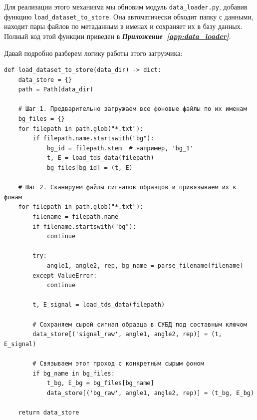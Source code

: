 Для реализации этого механизма мы обновим модуль \texttt{data\_loader.py}, добавив функцию \texttt{load\_dataset\_to\_store}. Она автоматически обходит папку с данными, находит пары файлов по метаданным в именах и сохраняет их в базу данных. Полный код этой функции приведен в \textbf{\textit{Приложение~\ref{app:data_loader}}}.

Давай подробно разберем логику работы этого загрузчика:
\begin{listing}[H]
	\caption{Реляционная загрузка данных в базу (data\_loader.py)}
	\begin{verbatim}
def load_dataset_to_store(data_dir) -> dict:
    data_store = {}
    path = Path(data_dir)
    
    # Шаг 1. Предварительно загружаем все фоновые файлы по их именам
    bg_files = {}
    for filepath in path.glob("*.txt"):
        if filepath.name.startswith("bg"):
            bg_id = filepath.stem  # например, 'bg_1'
            t, E = load_tds_data(filepath)
            bg_files[bg_id] = (t, E)
            
    # Шаг 2. Сканируем файлы сигналов образцов и привязываем их к фонам
    for filepath in path.glob("*.txt"):
        filename = filepath.name
        if filename.startswith("bg"):
            continue
            
        try:
            angle1, angle2, rep, bg_name = parse_filename(filename)
        except ValueError:
            continue
            
        t, E_signal = load_tds_data(filepath)
        
        # Сохраняем сырой сигнал образца в СУБД под составным ключом
        data_store[('signal_raw', angle1, angle2, rep)] = (t, E_signal)
        
        # Связываем этот проход с конкретным сырым фоном
        if bg_name in bg_files:
            t_bg, E_bg = bg_files[bg_name]
            data_store[('bg_raw', angle1, angle2, rep)] = (t_bg, E_bg)
            
    return data_store
	\end{verbatim}
\end{listing}




